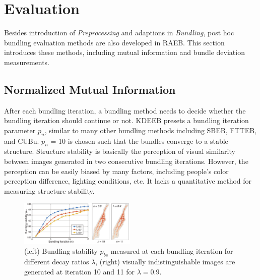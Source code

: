 \section{Evaluation}
\label{sec:eva}

Besides introduction of \textit{Preprocessing} and adaptions in \textit{Bundling}, post hoc bundling evaluation methods are also developed in RAEB.
This section introduces these methods, including mutual information and bundle deviation measurements.

\subsection{Normalized Mutual Information}
After each bundling iteration, a bundling method needs to decide whether the bundling iteration should continue or not.
KDEEB presets a bundling iteration parameter $p_n$, similar to many other bundling methods including SBEB, FTTEB, and CUBu.
$p_n$ = 10 is chosen such that the bundles converge to a stable structure.
Structure stability is basically the perception of visual similarity between images generated in two consecutive bundling iterations.
However, the perception can be easily biased by many factors, including people's color perception difference, lighting conditions, etc.
It lacks a quantitative method for measuring structure stability.

\begin{figure}[t]
	\centering
	\includegraphics[width=0.495\textwidth]{figure/edgebundling/fig5_NMI/bundle_termination.pdf}
	\vspace{-5mm}
	\caption{(left) Bundling stability $p_{bs}$ measured at each bundling iteration for different decay ratios $\lambda$, (right) visually indistinguishable images are generated at iteration 10 and 11 for $\lambda=0.9$.}
	\label{fig:nmi}
	\vspace{-4mm}
\end{figure}

